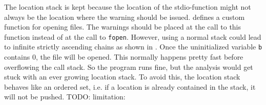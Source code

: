 The location stack is kept because the location of the stdio-function might not always be the location where the warning should be issued.  defines a custom function for opening files. The warnings should be placed at the call to this function instead of at the call to \verb|fopen|.
However, using a normal stack could lead to infinite strictly ascending chains as shown in . Once the uninitialized variable \verb|b| contains 0, the file will be opened. This normally happens pretty fast before overflowing the call stack. So the program runs fine, but the analysis would get stuck with an ever growing location stack. To avoid this, the location stack behaves like an ordered set, i.e. if a location is already contained in the stack, it will not be pushed. %
TODO: limitation: %


